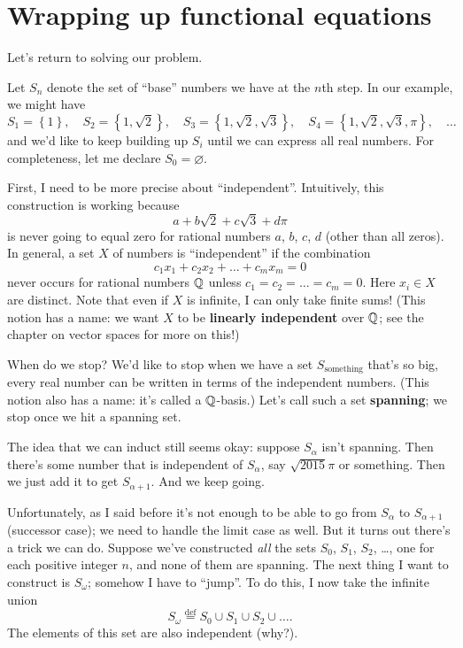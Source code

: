 \section{Wrapping up functional equations}
Let's return to solving our problem.

Let $S_n$ denote the set of ``base'' numbers we have at the $n$th step.
In our example, we might have
\[
	S_1 = \left\{ 1 \right\}, \quad
	S_2 = \left\{ 1, \sqrt 2 \right\}, \quad
	S_3 = \left\{ 1, \sqrt 2, \sqrt 3 \right\}, \quad
	S_4 = \left\{ 1, \sqrt 2, \sqrt 3, \pi \right\}, \quad
	\dots
\]
and we'd like to keep building up $S_i$ until we can express all real numbers.
For completeness, let me declare $S_0 = \varnothing$.

First, I need to be more precise about ``independent''.
Intuitively, this construction is working because
\[ a + b \sqrt 2 + c \sqrt 3 + d \pi \]
is never going to equal zero for rational numbers $a$, $b$, $c$, $d$ (other than all zeros).
In general, a set $X$ of numbers is ``independent'' if the combination
\[ c_1 x_1 + c_2 x_2 + \dots + c_m x_m = 0 \]
never occurs for rational numbers $\mathbb Q$ unless $c_1 = c_2 = \dots = c_m = 0$.
Here $x_i \in X$ are distinct. Note that even if $X$ is infinite,
I can only take finite sums!
(This notion has a name: we want $X$ to be \textbf{linearly independent} over $\mathbb Q$;
see the chapter on vector spaces for more on this!)

When do we stop?
We'd like to stop when we have a set $S_{\text{something}}$ that's so big,
every real number can be written in terms of the independent numbers.
(This notion also has a name: it's called a $\mathbb Q$-basis.)
Let's call such a set \textbf{spanning};
we stop once we hit a spanning set.

The idea that we can induct still seems okay:
suppose $S_\alpha$ isn't spanning.
Then there's some number that is independent of $S_\alpha$, say $\sqrt{2015}\pi$ or something.
Then we just add it to get $S_{\alpha+1}$.
And we keep going.

Unfortunately, as I said before it's not enough to be able to go from $S_\alpha$ to $S_{\alpha+1}$
(successor case); we need to handle the limit case as well.
But it turns out there's a trick we can do.
Suppose we've constructed \emph{all} the sets $S_0$, $S_1$, $S_2$, \dots, one for each positive integer $n$,
and none of them are spanning.
The next thing I want to construct is $S_\omega$; somehow I have to ``jump''.
To do this, I now take the infinite union
\[ S_\omega \overset{\text{def}}{=} S_0 \cup S_1 \cup S_2 \cup \dots. \]
The elements of this set are also independent (why?).

